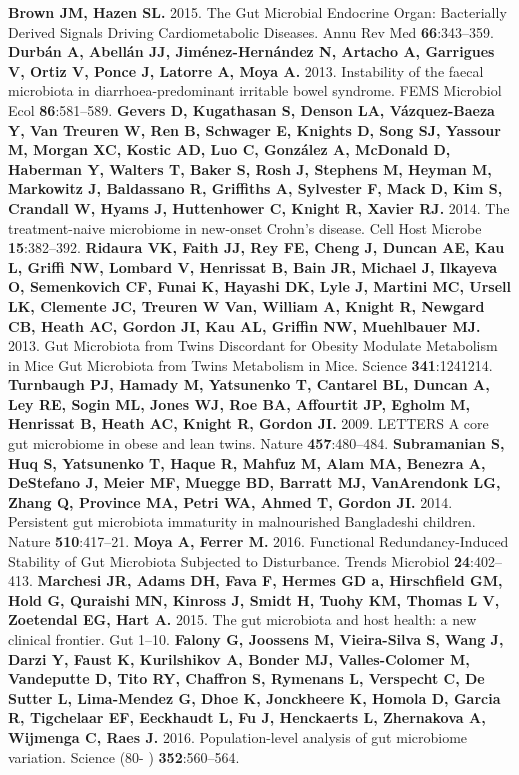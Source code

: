 \documentclass[12pt,oneside,letterpaper]{article}
\begin{document}
\begin{thebibliography}{99}
 {\bf Brown JM, Hazen SL.} 2015. The Gut Microbial Endocrine Organ: Bacterially Derived Signals Driving Cardiometabolic Diseases. Annu Rev Med {\bf 66}:343–359.
 {\bf Durbán A, Abellán JJ, Jiménez-Hernández N, Artacho A, Garrigues V, Ortiz V, Ponce J, Latorre A, Moya A.} 2013. Instability of the faecal microbiota in diarrhoea-predominant irritable bowel syndrome. FEMS Microbiol Ecol {\bf 86}:581–589.
 {\bf Gevers D, Kugathasan S, Denson LA, Vázquez-Baeza Y, Van Treuren W, Ren B, Schwager E, Knights D, Song SJ, Yassour M, Morgan XC, Kostic AD, Luo C, González A, McDonald D, Haberman Y, Walters T, Baker S, Rosh J, Stephens M, Heyman M, Markowitz J, Baldassano R, Griffiths A, Sylvester F, Mack D, Kim S, Crandall W, Hyams J, Huttenhower C, Knight R, Xavier RJ.} 2014. The treatment-naive microbiome in new-onset Crohn’s disease. Cell Host Microbe {\bf 15}:382–392.
 {\bf Ridaura VK, Faith JJ, Rey FE, Cheng J, Duncan AE, Kau L, Griffi NW, Lombard V, Henrissat B, Bain JR, Michael J, Ilkayeva O, Semenkovich CF, Funai K, Hayashi DK, Lyle J, Martini MC, Ursell LK, Clemente JC, Treuren W Van, William A, Knight R, Newgard CB, Heath AC, Gordon JI, Kau AL, Griffin NW, Muehlbauer MJ.} 2013. Gut Microbiota from Twins Discordant for Obesity Modulate Metabolism in Mice Gut Microbiota from Twins Metabolism in Mice. Science {\bf 341}:1241214.
 {\bf Turnbaugh PJ, Hamady M, Yatsunenko T, Cantarel BL, Duncan A, Ley RE, Sogin ML, Jones WJ, Roe BA, Affourtit JP, Egholm M, Henrissat B, Heath AC, Knight R, Gordon JI.} 2009. LETTERS A core gut microbiome in obese and lean twins. Nature {\bf 457}:480–484.
 {\bf Subramanian S, Huq S, Yatsunenko T, Haque R, Mahfuz M, Alam MA, Benezra A, DeStefano J, Meier MF, Muegge BD, Barratt MJ, VanArendonk LG, Zhang Q, Province MA, Petri WA, Ahmed T, Gordon JI.} 2014. Persistent gut microbiota immaturity in malnourished Bangladeshi children. Nature {\bf 510}:417–21.
 {\bf Moya A, Ferrer M.} 2016. Functional Redundancy-Induced Stability of Gut Microbiota Subjected to Disturbance. Trends Microbiol {\bf 24}:402–413.
 {\bf Marchesi JR, Adams DH, Fava F, Hermes GD a, Hirschfield GM, Hold G, Quraishi MN, Kinross J, Smidt H, Tuohy KM, Thomas L V, Zoetendal EG, Hart A.} 2015. The gut microbiota and host health: a new clinical frontier. Gut 1–10.
 {\bf Falony G, Joossens M, Vieira-Silva S, Wang J, Darzi Y, Faust K, Kurilshikov A, Bonder MJ, Valles-Colomer M, Vandeputte D, Tito RY, Chaffron S, Rymenans L, Verspecht C, De Sutter L, Lima-Mendez G, Dhoe K, Jonckheere K, Homola D, Garcia R, Tigchelaar EF, Eeckhaudt L, Fu J, Henckaerts L, Zhernakova A, Wijmenga C, Raes J.} 2016. Population-level analysis of gut microbiome variation. Science (80- ) {\bf 352}:560–564.

\end{thebibliography}
\end{document}
